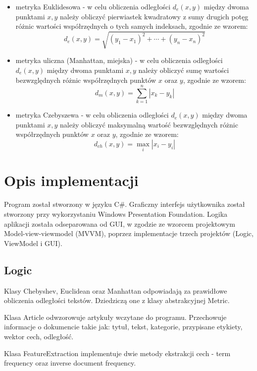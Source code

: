 \documentclass{classrep}
\begin{document}
\begin{itemize}
\item metryka Euklidesowa - w celu obliczenia odległości $ d_{e}(x,y) $ między dwoma punktami $ x, y $ należy obliczyć pierwiastek kwadratowy z sumy drugich potęg różnic wartości współrzędnych o tych samych indeksach, zgodnie ze wzorem:
$$
d_{e}(x,y)= \sqrt{ (y_{1} - x_{1})^2 + \cdots + (y_{n} - x_{n})^2 }
$$

\item metryka uliczna (Manhattan, miejska) - w celu obliczenia odległości $ d_{e}(x,y) $ między dwoma punktami $ x, y $ należy obliczyć sumę wartości bezwzględnych różnic współrzędnych punktów $ x $ oraz $ y $, zgodnie ze wzorem:
$$
d_{m}(x,y)= \sum_{k=1}^{n} | x_{k} - y_{k} |
$$

\item metryka Czebyszewa - w celu obliczenia odległości $ d_{e}(x,y) $ między dwoma punktami $ x, y $ należy obliczyć maksymalną wartość bezwzględnych różnic współrzędnych punktów $ x $ oraz $ y $, zgodnie ze wzorem:
$$
d_{ch}(x,y)= \max_{i} |x_{i} - y_{i}|
$$
\newline
\end{itemize}

\section{Opis implementacji}
Program został stworzony w języku C\#. Graficzny interfejs użytkownika został stworzony przy  wykorzystaniu Windows Presentation Foundation. Logika aplikacji została odseparowana od GUI, w zgodzie ze wzorcem projektowym Model-view-viewmodel (MVVM), poprzez implementacje trzech projektów (Logic, ViewModel i GUI).

\subsection{Logic}
Klasy Chebyshev, Euclidean oraz Manhattan odpowiadają za prawidłowe obliczenia odległości tekstów. Dziedziczą one z klasy abstrakcyjnej Metric. \newline

Klasa Article odwzorowuje artykuły wczytane do programu. Przechowuje informacje o dokumencie takie jak: tytuł, tekst, kategorie, przypisane etykiety, wektor cech, odległość. \newline

Klasa FeatureExtraction implementuje dwie metody ekstrakcji cech - term frequency oraz inverse document frequency. \newline
\end{document}
